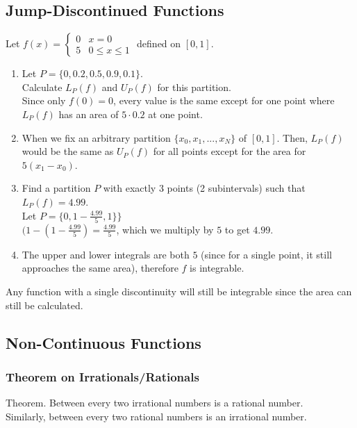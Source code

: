 \documentclass{article}
\begin{document}
\subsection{Jump-Discontinued Functions}
Let $f(x) = \begin{cases}
0 & x = 0\\
5 & 0 \leq x \leq 1
\end{cases}$
defined on $[0,1]$.
\begin{enumerate}
    \item Let $P = \{0, 0.2, 0.5, 0.9, 0.1\}$.\\
    Calculate $L_P(f)$ and $U_P(f)$ for this partition.\\
    Since only $f(0) = 0$, every value is the same except for one point where $L_P(f)$ has an area of $5 \cdot 0.2$ at one point.
    
    \item When we fix an arbitrary partition $\{x_0, x_1, ..., x_N\}$ of $[0,1]$. Then, $L_P(f)$ would be the same as $U_P(f)$ for all points except for the area for $5(x_1 - x_0)$.
    
    \item Find a partition $P$ with exactly 3 points (2 subintervals) such that $L_P(f) = 4.99$.\\
    Let $P = \{0, 1- \frac{4.99}{5}, 1\}\}$\\
    $(1 - (1 - \frac{4.99}{5}) = \frac{4.99}{5}$, which we multiply by $5$ to get $4.99$.
    
    \item The upper and lower integrals are both $5$ (since for a single point, it still approaches the same area), therefore $f$ is integrable.
\end{enumerate}
Any function with a single discontinuity will still be integrable since the area can still be calculated.

\subsection{Non-Continuous Functions}
\subsubsection{Theorem on Irrationals/Rationals}
Theorem. Between every two irrational numbers is a rational number.\\
Similarly, between every two rational numbers is an irrational number.
\end{document}
